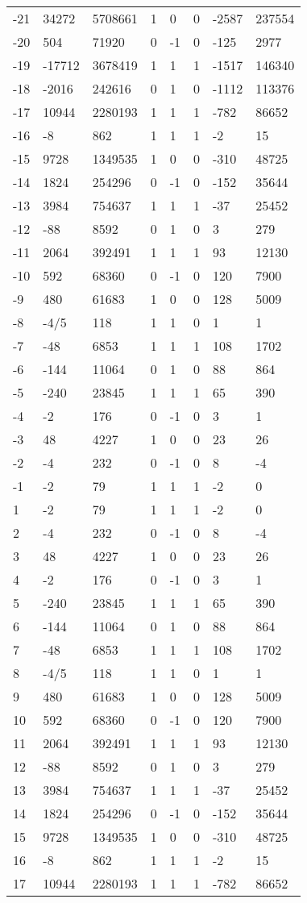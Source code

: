 \documentclass{amsart}
\begin{document}
\begin{longtable}{|l|l|l|lllll|}
-21&34272&5708661&1&0&0&-2587&237554\\
-20&504&71920&0&-1&0&-125&2977\\
-19&-17712&3678419&1&1&1&-1517&146340\\
-18&-2016&242616&0&1&0&-1112&113376\\
-17&10944&2280193&1&1&1&-782&86652\\
-16&-8&862&1&1&1&-2&15\\
-15&9728&1349535&1&0&0&-310&48725\\
-14&1824&254296&0&-1&0&-152&35644\\
-13&3984&754637&1&1&1&-37&25452\\
-12&-88&8592&0&1&0&3&279\\
-11&2064&392491&1&1&1&93&12130\\
-10&592&68360&0&-1&0&120&7900\\
-9&480&61683&1&0&0&128&5009\\
-8&-4/5&118&1&1&0&1&1\\
-7&-48&6853&1&1&1&108&1702\\
-6&-144&11064&0&1&0&88&864\\
-5&-240&23845&1&1&1&65&390\\
-4&-2&176&0&-1&0&3&1\\
-3&48&4227&1&0&0&23&26\\
-2&-4&232&0&-1&0&8&-4\\
-1&-2&79&1&1&1&-2&0\\
1&-2&79&1&1&1&-2&0\\
2&-4&232&0&-1&0&8&-4\\
3&48&4227&1&0&0&23&26\\
4&-2&176&0&-1&0&3&1\\
5&-240&23845&1&1&1&65&390\\
6&-144&11064&0&1&0&88&864\\
7&-48&6853&1&1&1&108&1702\\
8&-4/5&118&1&1&0&1&1\\
9&480&61683&1&0&0&128&5009\\
10&592&68360&0&-1&0&120&7900\\
11&2064&392491&1&1&1&93&12130\\
12&-88&8592&0&1&0&3&279\\
13&3984&754637&1&1&1&-37&25452\\
14&1824&254296&0&-1&0&-152&35644\\
15&9728&1349535&1&0&0&-310&48725\\
16&-8&862&1&1&1&-2&15\\
17&10944&2280193&1&1&1&-782&86652\\

\end{longtable}
\end{document}
